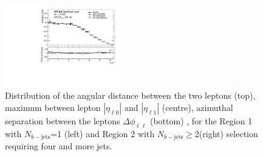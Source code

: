 \begin{figure}[!htb]
\includegraphics[width=0.45\textwidth]{Plots/ttV/shape/c_Region_1_lep_dPhi} 
  \caption{Distribution of the angular distance between the two leptons (top), maximum between lepton $|\eta_{\ell 0}|$ and $|\eta_{\ell 1}|$ (centre), azimuthal separation between the leptons $\Delta \phi _{\ell \ell }$ (bottom) , for the Region 1 with $N_{b-\mathrm{jets}}$=1 (left) and Region 2 with $N_{b-\mathrm{jets}}\geq$2(right) selection requiring four and more jets. 
   \label{ttV:ll_kin}}
\end{figure}
% 



